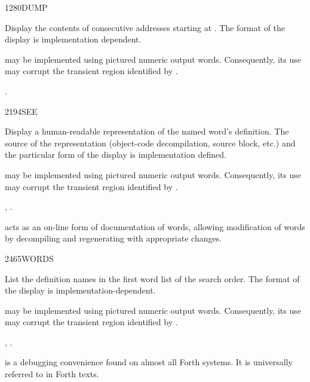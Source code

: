 \begin{worddef}{1280}{DUMP}
\item {}

	Display the contents of  consecutive addresses starting
	at . The format of the display is implementation
	dependent.

	 may be implemented using pictured numeric output
	words. Consequently, its use may corrupt the transient region
	identified by .

\see {}.
\end{worddef}


\begin{worddef}{2194}{SEE}
\item {}

	Display a human-readable representation of the named word's
	definition. The source of the representation (object-code
	decompilation, source block, etc.) and the particular form of
	the display is implementation defined.

	 may be implemented using pictured numeric output
	words. Consequently, its use may corrupt the transient region
	identified by .

\see {},
	.

	\begin{rationale} %
		 acts as an on-line form of documentation of
		words, allowing modification of words by decompiling and
		regenerating with appropriate changes.
	\end{rationale}
\end{worddef}


\begin{worddef}{2465}{WORDS}
\item \stack{}{}

	List the definition names in the first word list of the search
	order. The format of the display is implementation-dependent.

	 may be implemented using pictured numeric output
	words. Consequently, its use may corrupt the transient region
	identified by .

\see {},
	.

	\begin{rationale} %
		 is a debugging convenience found on almost
		all Forth systems. It is universally referred to in Forth texts.
	\end{rationale}
\end{worddef}



